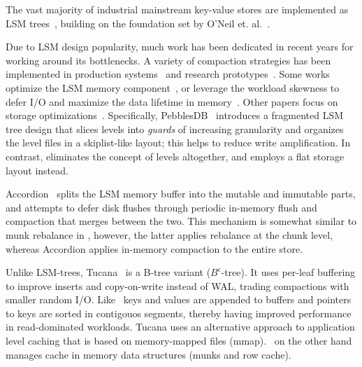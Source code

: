 

The vast majority of industrial mainstream key-value stores are  implemented as LSM trees~\cite{hbase, RocksDB, scylladb, Bigtable2008, cassandra2010}, building on the foundation set 
by O'Neil et. al.~\cite{O'Neil1996, Muth1998}.

Due to LSM design popularity, much work has been dedicated in recent years for working 
around its bottlenecks. A variety of compaction strategies has been implemented in production systems~\cite{CallaghanCompaction, ScyllaCompaction} and research prototypes~\cite{triad, PebblesDB}. Some works optimize the LSM memory component~\cite{clsm2015}, 
or leverage the workload
skewness to defer I/O and maximize the data lifetime in memory~\cite{triad, accordion}. Other papers
focus on storage optimizations~\cite{WiscKey, PebblesDB}. Specifically, PebblesDB~\cite{PebblesDB} 
introduces a fragmented LSM tree design that slices  levels into {\em guards\/} of increasing granularity and organizes the level files in a skiplist-like layout; this helps to reduce write amplification. In contrast, \sys\/ eliminates the concept of levels altogether, and employs a flat storage layout instead. 

Accordion~\cite{accordion} splits the LSM memory buffer into the mutable and immutable 
parts, and attempts to defer disk flushes through periodic in-memory flush and compaction 
that merges between the two. 
This mechanism is somewhat similar to munk rebalance in \sys, however, the latter applies 
rebalance at the chunk level, whereas Accordion applies in-memory compaction to the entire store.

Unlike LSM-trees, Tucana~\cite{tucana} is a B-tree variant ($B^{\epsilon}$-tree). It uses per-leaf buffering to improve inserts and copy-on-write instead of WAL, trading compactions with smaller random I/O. 
Like \sys\ keys and values are appended to buffers and pointers to keys are sorted in contigouos segments, thereby having improved performance in read-dominated workloads.
Tucana uses an alternative approach to application level caching that is based on memory-mapped files (mmap). \sys\ on the other hand manages cache in memory data structures (munks and row cache).


